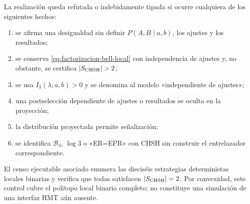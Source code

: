 \begin{criterion}
\label{crit:bell-localidad-no-localidad}
La realización queda refutada o indebidamente tipada si ocurre cualquiera de
los siguientes hechos:

\begin{enumerate}
\item se afirma una desigualdad sin definir \(P(A,B\mid a,b)\), los ajustes y
los resultados;
\item se conserva \eqref{eq:factorizacion-bell-local} con independencia de
ajustes y, no obstante, se certifica \(|S_{\rm CHSH}|>2\);
\item se usa \(I_3(\lambda;a,b)>0\) y se denomina al modelo
«independiente de ajustes»;
\item una postselección dependiente de ajustes o resultados se oculta en la
proyección;
\item la distribución proyectada permite señalización;
\item se identifica \(\mathcal B_3\), \(\log 3\) o «ER=EPR» con CHSH sin
construir el entrelazador correspondiente.
\end{enumerate}
\end{criterion}

El censo ejecutable asociado enumera las dieciséis estrategias deterministas
locales binarias y verifica que todas satisfacen
\(|S_{\rm CHSH}|=2\). Por convexidad, este control cubre el politopo local
binario completo; no constituye una simulación de una interfaz HMT aún
ausente.
